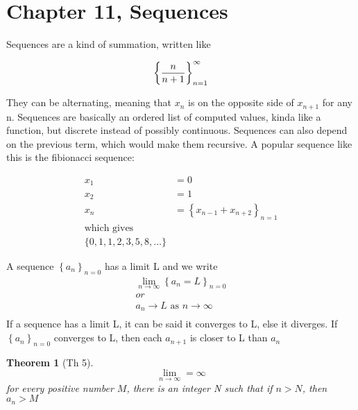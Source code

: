 \documentclass[17pt]{extarticle} %
\begin{document}
\newcommand\abs[1]{\left|#1\right|} %
\newcommand{\seq}[2][0]{\left\{ #2 \right\}_{n=#1}}
\newtheorem{theorem}{Theorem}
\newtheorem*{theorem*}{Theorem}
\newtheorem*{definition}{Definition}

\section{Chapter 11, Sequences}




Sequences are a kind of summation, written like

$$
    \seq[1]{n \over n+1}^\infty
$$


They can be alternating, meaning that $x_n$ is on the opposite side of $x_{n+1}$ for any n. Sequences are basically an ordered list of computed values, kinda like a function, but discrete instead of possibly continuous. Sequences can also depend on the previous term, which would make them recursive. A popular sequence like this is the fibionacci sequence:

$$
    \begin{aligned}
        x_1 & = 0                          \\
        x_2 & = 1                          \\
        x_n & = \seq[1]{x_{n-1} + x_{n+2}} \\
        \text{which gives}                 \\
        \{0, 1, 1, 2, 3, 5, 8, \ldots\}
    \end{aligned}
$$


A sequence $\seq{a_n}$ has a limit L and we write
$$
    \begin{aligned}
        \lim_{n \to \infty} \seq{a_n = L}  \\
        or                                 \\
        a_n \to L \text{ as } n \to \infty \\
    \end{aligned}
$$
If a sequence has a limit L, it can be said it converges to L, else it diverges.
If $\seq{a_n}$ converges to L, then each $a_{n+1}$ is closer to L than $a_{n}$


\begin{theorem*}[Th 5]
    $$
        \lim_{n\to \infty} = \infty
    $$
    for every positive number $M$, there is an integer N such that if $n >  N$, then $a_n > M$
\end{theorem*}
\end{document}
